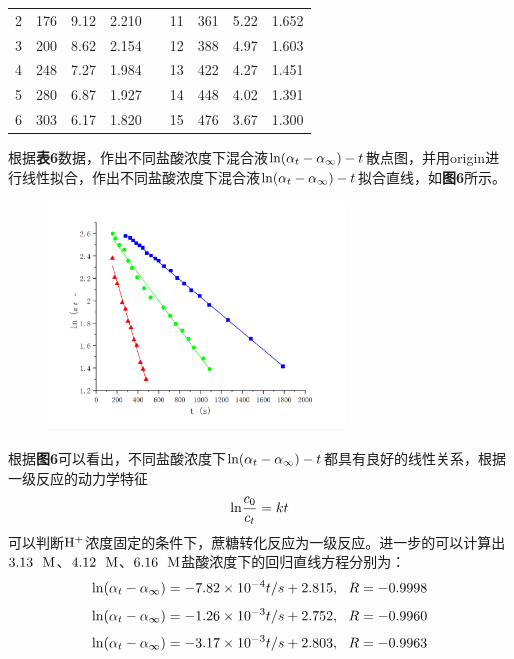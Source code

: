 \documentclass[12pt]{article}
\begin{document}
\begin{table}[!h]
\begin{tabular}{ccccccccc}
					2  & 176           & 9.12                & 2.210   &  & 11 & 361           & 5.22                & 1.652   \\
					3  & 200           & 8.62                & 2.154   &  & 12 & 388           & 4.97                & 1.603    \\
					4  & 248           & 7.27                & 1.984   &  & 13 & 422           & 4.27                & 1.451   \\
					5  & 280           & 6.87                & 1.927   &  & 14 & 448           & 4.02                & 1.391   \\
					6  & 303           & 6.17                & 1.820   &  & 15 & 476           & 3.67                & 1.300   \\
					\bottomrule
					\end{tabular}
					\end{table}
					根据\textbf{表6}数据，作出不同盐酸浓度下混合液${\rm ln}(\alpha_{t}-\alpha_{\infty})-t$散点图，并用origin进行线性拟合，作出不同盐酸浓度下混合液${\rm ln}(\alpha_{t}-\alpha_{\infty})-t$拟合直线，如\textbf{图6}所示。
					\begin{figure}[!h]
						\centering
						\includegraphics[width=0.70\textwidth]{6.png}
					\end{figure}
					根据\textbf{图6}可以看出，不同盐酸浓度下${\rm ln}(\alpha_{t}-\alpha_{\infty})-t$都具有良好的线性关系，根据一级反应的动力学特征
					$$
					{\rm ln}\frac{c_{0}}{c_{t}}=kt
					$$
					可以判断$\rm H^{+}$浓度固定的条件下，蔗糖转化反应为一级反应。进一步的可以计算出$3.13\ \ {\rm M}$、$4.12\ \ {\rm M}$、$6.16\ \ {\rm M}$盐酸浓度下的回归直线方程分别为：
					$$
					{\rm ln}(\alpha_{t}-\alpha_{\infty})=-7.82\times10^{-4}t/s+2.815,\ \ R=-0.9998
					$$
					$$
					{\rm ln}(\alpha_{t}-\alpha_{\infty})=-1.26\times10^{-3}t/s+2.752,\ \ R=-0.9960
					$$
					$$
					{\rm ln}(\alpha_{t}-\alpha_{\infty})=-3.17\times10^{-3}t/s+2.803,\ \ R=-0.9963
					$$
\end{document}

